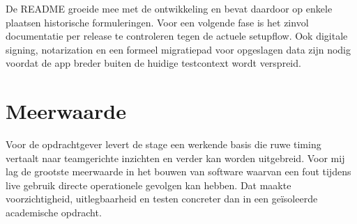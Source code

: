 De README groeide mee met de ontwikkeling en bevat daardoor op enkele plaatsen historische formuleringen. Voor een volgende fase is het zinvol documentatie per release te controleren tegen de actuele setupflow. Ook digitale signing, notarization en een formeel migratiepad voor opgeslagen data zijn nodig voordat de app breder buiten de huidige testcontext wordt verspreid.

\section{Meerwaarde}
Voor de opdrachtgever levert de stage een werkende basis die ruwe timing vertaalt naar teamgerichte inzichten en verder kan worden uitgebreid. Voor mij lag de grootste meerwaarde in het bouwen van software waarvan een fout tijdens live gebruik directe operationele gevolgen kan hebben. Dat maakte voorzichtigheid, uitlegbaarheid en testen concreter dan in een geïsoleerde academische opdracht.

